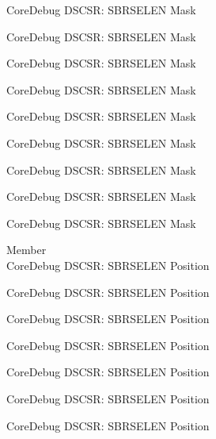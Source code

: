 \begin{DoxyRefList}
\label{deprecated__deprecated000651}%
%
Core\+Debug DSCSR\+: SBRSELEN Mask 

\label{deprecated__deprecated000757}%
%
Core\+Debug DSCSR\+: SBRSELEN Mask 

\label{deprecated__deprecated000811}%
%
Core\+Debug DSCSR\+: SBRSELEN Mask 

\label{deprecated__deprecated000887}%
%
Core\+Debug DSCSR\+: SBRSELEN Mask 

\label{deprecated__deprecated000950}%
%
Core\+Debug DSCSR\+: SBRSELEN Mask 

\label{deprecated__deprecated001029}%
%
Core\+Debug DSCSR\+: SBRSELEN Mask 

\label{deprecated__deprecated001105}%
%
Core\+Debug DSCSR\+: SBRSELEN Mask 

\label{deprecated__deprecated001208}%
%
Core\+Debug DSCSR\+: SBRSELEN Mask 

\label{deprecated__deprecated001310}%
%
Core\+Debug DSCSR\+: SBRSELEN Mask  
\item[Member \doxylink{group___c_m_s_i_s___s_c_b_ga3eb88e444b678057db1b59272eebb1ad}{Core\+Debug\+\_\+\+DSCSR\+\_\+\+SBRSELEN\+\_\+\+Pos} ]\hfill \\
\label{deprecated__deprecated000097}%
%
Core\+Debug DSCSR\+: SBRSELEN Position 

\label{deprecated__deprecated000151}%
%
Core\+Debug DSCSR\+: SBRSELEN Position 

\label{deprecated__deprecated000227}%
%
Core\+Debug DSCSR\+: SBRSELEN Position 

\label{deprecated__deprecated000290}%
%
Core\+Debug DSCSR\+: SBRSELEN Position 

\label{deprecated__deprecated000369}%
%
Core\+Debug DSCSR\+: SBRSELEN Position 

\label{deprecated__deprecated000445}%
%
Core\+Debug DSCSR\+: SBRSELEN Position 

\label{deprecated__deprecated000548}%
%
Core\+Debug DSCSR\+: SBRSELEN Position 


\end{DoxyRefList}
